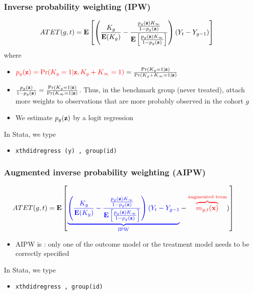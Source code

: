 \documentclass[11pt]{beamer}
\begin{document}
\begin{frame}
  \frametitle{Inverse probability weighting (IPW)}
\begin{align*}
  ATET(g, t) = 
  \mathbf{E}\left[
    \left(
    \frac{K_g}{\mathbf{E}(K_g)} 
    - \frac{\frac{p_g(\mathbf{z})K_\infty}{1-p_g(\mathbf{z})}}
    {\mathbf{E}\left[ \frac{p_g(\mathbf{z})K_\infty}{1-p_g(\mathbf{z})} \right]}
    \right)
    (Y_t - Y_{g - 1})
  \right]
\end{align*}
where 
\begin{itemize}
  \item ${\color{red}{p_g(\mathbf{z}) = \Pr(K_g = 1 | \mathbf{z}, K_g + K_\infty = 1)}} = 
\frac{\Pr(K_g = 1| \mathbf{z})}{\Pr(K_g + K_\infty = 1 | \mathbf{z})}$

\item $\frac{p_g(\mathbf{z})}{1 - p_g(\mathbf{z})} = \frac{\Pr(K_g =1
  |\mathbf{z})}{\Pr(K_\infty=1|\mathbf{z})}$. 
  Thus, in the benchmark group (never treated), attach more weights to
  observations that are more probably observed in the cohort $g$

\item We estimate $p_g(\mathbf{z})$ by a logit regression
\end{itemize}

\vskip 0.5cm
In Stata, we type
\begin{itemize}
\item {\large \tt xthdidregress  
  (y) , group(id)}
\end{itemize}
\end{frame}

\begin{frame}
  \frametitle{Augmented inverse probability weighting (AIPW)}
\begin{align*}
  ATET(g, t) &= 
  \mathbf{E}\left[
    {\color{blue}{\underbrace{
    \left(
    \frac{K_g}{\mathbf{E}(K_g)} 
    - \frac{\frac{p_g(\mathbf{z})K_\infty}{1-p_g(\mathbf{z})}}
    {\mathbf{E}\left[ \frac{p_g(\mathbf{z})K_\infty}{1-p_g(\mathbf{z})} \right]}
    \right)
    (
    Y_t - Y_{g - 1}}_\text{IPW}}} - {\color{red}{\overbrace{m_{g,
    t}(\mathbf{x})}^\text{augmented term}}}
    )
  \right] 
\end{align*}
\begin{itemize}
  \item AIPW is : only one of the outcome model or the
    treatment model needs to be correctly specified
\end{itemize}

\vskip 0.5cm
In Stata, we type
\begin{itemize}
\item {\large \tt xthdidregress  
  , 
group(id)}
\end{itemize}
\end{frame}
\end{document}
